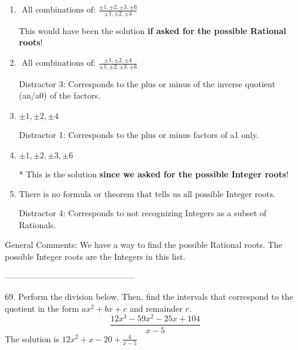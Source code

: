 \documentclass{extbook}[14pt]
\begin{document}
\begin{enumerate}[label=\Alph*.] 
\item $ \text{ All combinations of: }\frac{\pm 1,\pm 2,\pm 3,\pm 6}{\pm 1,\pm 2,\pm 4} $ 

 This would have been the solution \textbf{if asked for the possible Rational roots}! 
\item $ \text{ All combinations of: }\frac{\pm 1,\pm 2,\pm 4}{\pm 1,\pm 2,\pm 3,\pm 6} $ 

  Distractor 3: Corresponds to the plus or minus of the inverse quotient (an/a0) of the factors.  
\item $ \pm 1,\pm 2,\pm 4 $ 

  Distractor 1: Corresponds to the plus or minus factors of a1 only. 
\item $ \pm 1,\pm 2,\pm 3,\pm 6 $ 

 * This is the solution \textbf{since we asked for the possible Integer roots}! 
\item $ \text{There is no formula or theorem that tells us all possible Integer roots.} $ 

  Distractor 4: Corresponds to not recognizing Integers as a subset of Rationals. 
\end{enumerate} 
 
General Comments: We have a way to find the possible Rational roots. The possible Integer roots are the Integers in this list.

-----------------------------------------------

69. Perform the division below. Then, find the intervals that correspond to the quotient in the form $ax^2+bx+c$ and remainder $r$.
\[ \frac{12x^{3} -59 x^{2} -25 x + 104}{x -5} \] 
The solution is $ 12x^{2} +x -20 + \frac{4}{x -5} $ 
\end{document}
